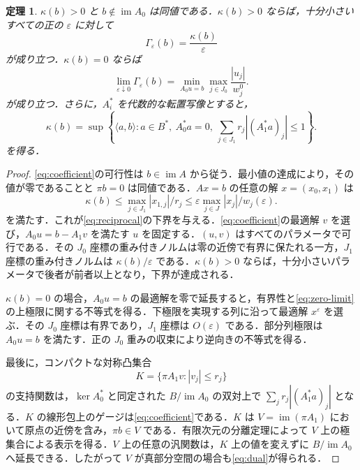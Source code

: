 \documentclass[11pt,a4paper]{article}
\numberwithin{equation}{section}
\theoremstyle{japanese}
\newtheorem{theorem}{定理}[section]
\theoremstyle{remark}
\newcommand{\im}{\operatorname{im}}
\begin{document}
\begin{theorem}\label{thm:reciprocal}
$\kappa(b)>0$ と $b\notin\im A_0$ は同値である．$\kappa(b)>0$ ならば，十分小さいすべての正の $\varepsilon$ に対して
\begin{equation}\label{eq:reciprocal}
 \Gamma_\varepsilon(b)=\frac{\kappa(b)}{\varepsilon}
\end{equation}
が成り立つ．$\kappa(b)=0$ ならば
\begin{equation}\label{eq:zero-limit}
 \lim_{\varepsilon\downarrow0}\Gamma_\varepsilon(b)
 =\min_{A_0u=b}\max_{j\in J_0}\frac{|u_j|}{w_j^0}.
\end{equation}
が成り立つ．さらに，$A_i^*$ を代数的な転置写像とすると，
\begin{equation}\label{eq:dual}
 \kappa(b)=\sup\left\{\langle a,b\rangle:a\in B^*,\ A_0^*a=0,
 \ \sum_{j\in J_1}r_j|(A_1^*a)_j|\le1\right\}.
\end{equation}
を得る．
\end{theorem}
\begin{proof}
\eqref{eq:coefficient}の可行性は $b\in\im A$ から従う．最小値の達成により，その値が零であることと $\pi b=0$ は同値である．$Ax=b$ の任意の解 $x=(x_0,x_1)$ は
\[
 \kappa(b)\le\max_{j\in J_1}|x_{1,j}|/r_j
 \le\varepsilon\max_{j\in J}|x_j|/w_j(\varepsilon).
\]
を満たす．これが\eqref{eq:reciprocal}の下界を与える．\eqref{eq:coefficient}の最適解 $v$ を選び，$A_0u=b-A_1v$ を満たす $u$ を固定する．$(u,v)$ はすべてのパラメータで可行である．その $J_0$ 座標の重み付きノルムは零の近傍で有界に保たれる一方，$J_1$ 座標の重み付きノルムは $\kappa(b)/\varepsilon$ である．$\kappa(b)>0$ ならば，十分小さいパラメータで後者が前者以上となり，下界が達成される．

$\kappa(b)=0$ の場合，$A_0u=b$ の最適解を零で延長すると，有界性と\eqref{eq:zero-limit}の上極限に関する不等式を得る．下極限を実現する列に沿って最適解 $x^\varepsilon$ を選ぶ．その $J_0$ 座標は有界であり，$J_1$ 座標は $O(\varepsilon)$ である．部分列極限は $A_0u=b$ を満たす．正の $J_0$ 重みの収束により逆向きの不等式を得る．

最後に，コンパクトな対称凸集合
\[
 K=\{\pi A_1v:|v_j|\le r_j\}
\]
の支持関数は，$\ker A_0^*$ と同定された $B/\im A_0$ の双対上で $\sum_j r_j|(A_1^*a)_j|$ となる．$K$ の線形包上のゲージは\eqref{eq:coefficient}である．$K$ は $V=\im(\pi A_1)$ において原点の近傍を含み，$\pi b\in V$ である．有限次元の分離定理によって $V$ 上の極集合による表示を得る．$V$ 上の任意の汎関数は，$K$ 上の値を変えずに $B/\im A_0$ へ延長できる．したがって $V$ が真部分空間の場合も\eqref{eq:dual}が得られる．
\end{proof}
\end{document}
